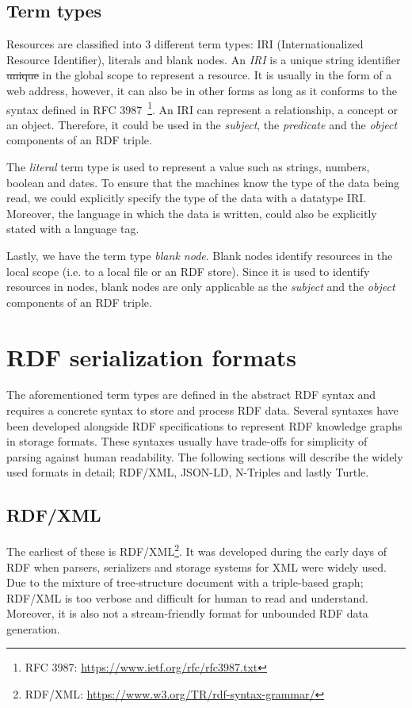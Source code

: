 \subsection{Term types}
Resources are classified into 3 different term types: IRI (Internationalized Resource Identifier),
literals and blank nodes. An \textit{IRI} is a unique string identifier \sout{unique} in the global scope to
represent a resource. It is usually in the form of a web address, however, it can
also be in other forms as long as it conforms to the syntax defined in
RFC 3987~\footnote{RFC 3987: \url{https://www.ietf.org/rfc/rfc3987.txt}}.
An IRI can represent a relationship, a concept or an object. Therefore, it could be
used in the \textit{subject}, the \textit{predicate} and the \textit{object} components of
an RDF triple.

The \textit{literal} term type is used to represent a value such as strings, numbers, boolean and dates.
To ensure that the machines know the type of the data being read, we could
explicitly specify the type of the data with a datatype IRI. Moreover, the
language in which the data is written, could also be explicitly stated with
a language tag.

Lastly, we have the term type \textit{blank node}. Blank nodes identify resources
in the local scope (i.e. to a local file or an RDF store). Since it is used to
identify resources in nodes, blank nodes are only applicable as the \textit{subject}
and the \textit{object} components of an RDF triple.

\section{RDF serialization formats}

The aforementioned term types are defined in the abstract RDF syntax and 
requires a concrete syntax to store and process RDF data. 
Several syntaxes have been developed alongside RDF specifications to represent RDF
knowledge graphs in storage formats. These syntaxes usually have trade-offs for simplicity of parsing against 
human readability. The following sections will describe the widely used formats in detail; 
RDF/XML, JSON-LD, N-Triples and lastly Turtle. 


\subsection{RDF/XML}
The earliest of these is RDF/XML\footnote{RDF/XML: \url{https://www.w3.org/TR/rdf-syntax-grammar/}}. 
It was developed during the early days of RDF when parsers, serializers and storage systems 
for XML were widely used. 
Due to the mixture of tree-structure document with a triple-based graph;
RDF/XML is too verbose and difficult for human to read and understand. Moreover, 
it is also not a stream-friendly format for unbounded RDF data generation.


